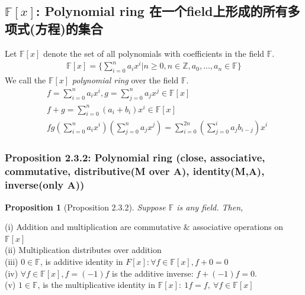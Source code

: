 \documentclass[11pt,a4paper]{article}
\newtheorem{proposition}{Proposition}
\begin{document}
\subsection{$\mathbb{F}[x]$: Polynomial ring 在一个field上形成的所有多项式(方程)的集合}
Let $\mathbb{F}[x]$ denote the set of all polynomials with coefficients in the field $\mathbb{F}$.
\begin{equation}
    \begin{aligned}
        \mathbb{F}[x]=\{\sum_{i=0}^na_ix^i|n\geq0,n\in\mathbb{Z}, a_0,...,a_n\in\mathbb{F}\}
    \end{aligned}
    \nonumber
\end{equation}
We call the $\mathbb{F}[x]$ \textit{polynomial ring} over the field $\mathbb{F}$.
\begin{equation}
    \begin{aligned}
        &f=\sum_{i=0}^na_ix^i, g=\sum_{j=0}^na_jx^j \in\mathbb{F}[x]\\
        &f+g=\sum_{i=0}^n(a_i+b_i)x^i\in\mathbb{F}[x]\\
        &fg(\sum_{i=0}^na_ix^i)(\sum_{j=0}^na_jx^j)=\sum_{i=0}^{2n}(\sum_{j=0}^ia_jb_{i-j})x^i
    \end{aligned}
    \nonumber
\end{equation}

\subsubsection{Proposition 2.3.2: Polynomial ring (close, associative, commutative, distributive(M over A), identity(M,A), inverse(only A))}
\begin{proposition}[Proposition 2.3.2]
Suppose $\mathbb{F}$ is any field. Then,
\end{proposition}
(i) Addition and multiplication are commutative $\&$ associative operations on $\mathbb{F}[x]$\\
(ii) Multiplication distributes over addition\\
(iii) $0 \in \mathbb{F}$, is additive identity in $F[x]: \forall f \in \mathbb{F}[x], f + 0 = 0$\\
(iv) $\forall f \in \mathbb{F}[x], f = (-1)f$ is the additive inverse: $f + (-1)f = 0$.\\
(v) $1 \in \mathbb{F}$, is the multiplicative identity in $\mathbb{F}[x]:\ 1f = f,\  \forall f \in \mathbb{F}[x]$
\end{document}
